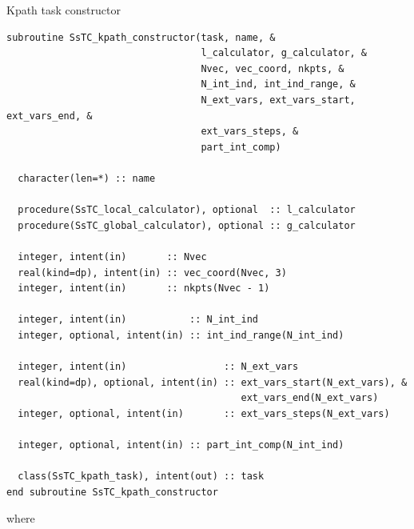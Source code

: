 \documentclass[10pt,a4paper]{article}
\begin{document}
\begin{codebox}{Kpath task constructor}
\begin{lstlisting}[caption={Interface of the kpath task constructor.},captionpos=b]
subroutine SsTC_kpath_constructor(task, name, &
                                  l_calculator, g_calculator, &
                                  Nvec, vec_coord, nkpts, &
                                  N_int_ind, int_ind_range, &
                                  N_ext_vars, ext_vars_start, ext_vars_end, &
                                  ext_vars_steps, &
                                  part_int_comp)

  character(len=*) :: name

  procedure(SsTC_local_calculator), optional  :: l_calculator
  procedure(SsTC_global_calculator), optional :: g_calculator

  integer, intent(in)       :: Nvec
  real(kind=dp), intent(in) :: vec_coord(Nvec, 3)
  integer, intent(in)       :: nkpts(Nvec - 1)

  integer, intent(in)           :: N_int_ind
  integer, optional, intent(in) :: int_ind_range(N_int_ind)

  integer, intent(in)                 :: N_ext_vars
  real(kind=dp), optional, intent(in) :: ext_vars_start(N_ext_vars), &
                                         ext_vars_end(N_ext_vars)
  integer, optional, intent(in)       :: ext_vars_steps(N_ext_vars)

  integer, optional, intent(in) :: part_int_comp(N_int_ind)

  class(SsTC_kpath_task), intent(out) :: task
end subroutine SsTC_kpath_constructor
\end{lstlisting}
\end{codebox}
where
\end{document}
